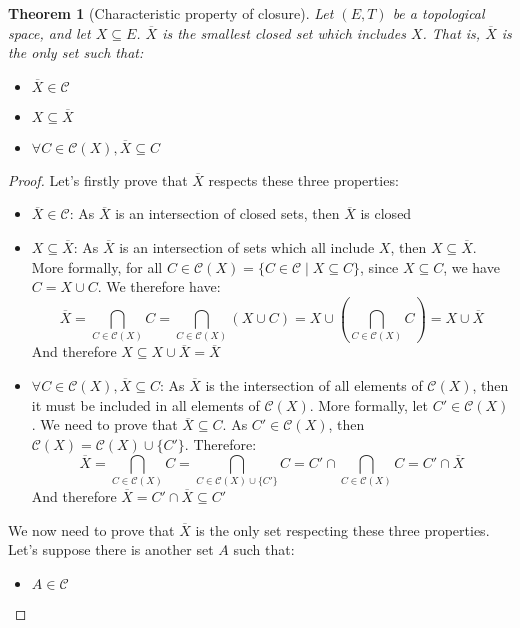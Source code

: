 \documentclass{article}
\newtheorem{theorem}{Theorem}[section]
\theoremstyle{definition}
\theoremstyle{remark}
\theoremstyle{example}
\theoremstyle{notation}
\newcommand{\closed}{\mathcal{C}}
\begin{document}
\begin{theorem}[Characteristic property of closure] \label{thm:closure-charac}
		Let $(E, T)$ be a topological space, and let $X \subseteq E$. $\overline{X}$ is the smallest closed set which includes $X$. That is, $\overline{X}$ is the only set such that:
		\begin{itemize}
				\item $\overline{X} \in \closed$
				\item $X \subseteq \overline{X}$
				\item $\forall C \in \closed(X), \overline{X} \subseteq C$
		\end{itemize}
\end{theorem}

\begin{proof}
		Let's firstly prove that $\overline{X}$ respects these three properties:
		\begin{itemize}
				\item $\overline{X} \in \closed$: As $\overline{X}$ is an intersection of closed sets, then $\overline{X}$ is closed
				\item $X \subseteq \overline{X}$: As $\overline{X}$ is an intersection of sets which all include $X$, then $X \subseteq \overline{X}$. More formally, for all $C \in \closed(X) = \{C \in \closed \mid X \subseteq C\}$, since $X \subseteq C$, we have $C = X \cup C$. We therefore have:
						$$\overline{X} = \bigcap_{C \in \closed(X)} C = \bigcap_{C \in \closed(X)} (X \cup C) = X \cup (\bigcap_{C \in \closed(X)} C) = X \cup \overline{X}$$
				And therefore $X \subseteq X \cup \overline{X} = \overline{X}$
				\item $\forall C \in \closed(X), \overline{X} \subseteq C$: As $\overline{X}$ is the intersection of all elements of $\closed(X)$, then it must be included in all elements of $\closed(X)$. More formally, let $C' \in \closed(X)$. We need to prove that $\overline{X} \subseteq C$. As $C' \in \closed(X)$, then $\closed(X) = \closed(X) \cup \{C'\}$. Therefore:
						$$\overline{X} = \bigcap_{C \in \closed(X)} C = \bigcap_{C \in \closed(X) \cup \{C'\}} C = C' \cap \bigcap_{C \in \closed(X)} C = C' \cap \overline{X}$$
				And therefore $\overline{X} = C' \cap \overline{X} \subseteq C'$
		\end{itemize}
		We now need to prove that $\overline{X}$ is the only set respecting these three properties. Let's suppose there is another set $A$ such that:
		\begin{itemize}
				\item $A \in \closed$

\end{itemize}
\end{proof}
\end{document}
